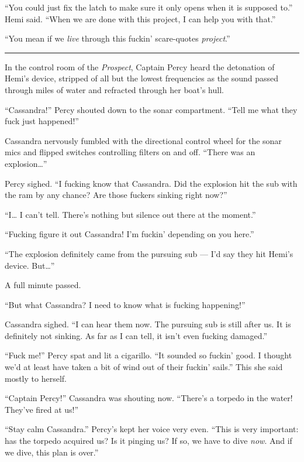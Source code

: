 \documentclass[]{scrbook}
\begin{document}
``You could just fix the latch to make sure it only opens when it is
supposed to.'' Hemi said. ``When we are done with this project, I can
help you with that.''

``You mean if we \emph{live} through this fuckin' scare-quotes
\emph{project}.''

\begin{center}\rule{0.5\linewidth}{\linethickness}\end{center}

In the control room of the \emph{Prospect}, Captain Percy heard the
detonation of Hemi's device, stripped of all but the lowest frequencies
as the sound passed through miles of water and refracted through her
boat's hull.

``Cassandra!'' Percy shouted down to the sonar compartment. ``Tell me
what they fuck just happened!''

Cassandra nervously fumbled with the directional control wheel for the
sonar mics and flipped switches controlling filters on and off. ``There
was an explosion\ldots{}''

Percy sighed. ``I fucking know that Cassandra. Did the explosion hit the
sub with the ram by any chance? Are those fuckers sinking right now?''

``I\ldots{} I can't tell. There's nothing but silence out there at the
moment.''

``Fucking figure it out Cassandra! I'm fuckin' depending on you here.''

``The explosion definitely came from the pursuing sub --- I'd say they
hit Hemi's device. But\ldots{}''

A full minute passed.

``But what Cassandra? I need to know what is fucking happening!''

Cassandra sighed. ``I can hear them now. The pursuing sub is still after
us. It is definitely not sinking. As far as I can tell, it isn't even
fucking damaged.''

``Fuck me!'' Percy spat and lit a cigarillo. ``It sounded so fuckin'
good. I thought we'd at least have taken a bit of wind out of their
fuckin' sails.'' This she said mostly to herself.

``Captain Percy!'' Cassandra was shouting now. ``There's a torpedo in
the water! They've fired at us!''

``Stay calm Cassandra.'' Percy's kept her voice very even. ``This is
very important: has the torpedo acquired us? Is it pinging us? If so, we
have to dive \emph{now}. And if we dive, this plan is over.''
\end{document}
